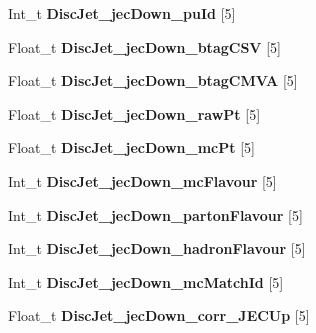 \begin{DoxyCompactItemize}
\hypertarget{classMiniTree_afe9c0e84d00805b89f1e4a75ca7475a2}{}\label{classMiniTree_afe9c0e84d00805b89f1e4a75ca7475a2} 
Int\+\_\+t {\bfseries Disc\+Jet\+\_\+jec\+Down\+\_\+pu\+Id} \mbox{[}5\mbox{]}
\item 
\hypertarget{classMiniTree_a3c160242de6b3affbdd6c7a5c86b419f}{}\label{classMiniTree_a3c160242de6b3affbdd6c7a5c86b419f} 
Float\+\_\+t {\bfseries Disc\+Jet\+\_\+jec\+Down\+\_\+btag\+C\+SV} \mbox{[}5\mbox{]}
\item 
\hypertarget{classMiniTree_a4123243bed4af1fbe32d3fdfa10d9962}{}\label{classMiniTree_a4123243bed4af1fbe32d3fdfa10d9962} 
Float\+\_\+t {\bfseries Disc\+Jet\+\_\+jec\+Down\+\_\+btag\+C\+M\+VA} \mbox{[}5\mbox{]}
\item 
\hypertarget{classMiniTree_a879a1c51b3b085956882e660aad001a8}{}\label{classMiniTree_a879a1c51b3b085956882e660aad001a8} 
Float\+\_\+t {\bfseries Disc\+Jet\+\_\+jec\+Down\+\_\+raw\+Pt} \mbox{[}5\mbox{]}
\item 
\hypertarget{classMiniTree_a0db6da4e20027b93e8bca833937878b8}{}\label{classMiniTree_a0db6da4e20027b93e8bca833937878b8} 
Float\+\_\+t {\bfseries Disc\+Jet\+\_\+jec\+Down\+\_\+mc\+Pt} \mbox{[}5\mbox{]}
\item 
\hypertarget{classMiniTree_a07fc5d50c4f9489502cdff715662400a}{}\label{classMiniTree_a07fc5d50c4f9489502cdff715662400a} 
Int\+\_\+t {\bfseries Disc\+Jet\+\_\+jec\+Down\+\_\+mc\+Flavour} \mbox{[}5\mbox{]}
\item 
\hypertarget{classMiniTree_a234b7b1c234cd0ffa3b21810fbd57aec}{}\label{classMiniTree_a234b7b1c234cd0ffa3b21810fbd57aec} 
Int\+\_\+t {\bfseries Disc\+Jet\+\_\+jec\+Down\+\_\+parton\+Flavour} \mbox{[}5\mbox{]}
\item 
\hypertarget{classMiniTree_ad23dca40a5c8d9ce988393129627ad4a}{}\label{classMiniTree_ad23dca40a5c8d9ce988393129627ad4a} 
Int\+\_\+t {\bfseries Disc\+Jet\+\_\+jec\+Down\+\_\+hadron\+Flavour} \mbox{[}5\mbox{]}
\item 
\hypertarget{classMiniTree_a35bf296a37ad9061cdd4b91f5beef716}{}\label{classMiniTree_a35bf296a37ad9061cdd4b91f5beef716} 
Int\+\_\+t {\bfseries Disc\+Jet\+\_\+jec\+Down\+\_\+mc\+Match\+Id} \mbox{[}5\mbox{]}
\item 
\hypertarget{classMiniTree_ac71649e5c995dd9e1ca485afa0263a32}{}\label{classMiniTree_ac71649e5c995dd9e1ca485afa0263a32} 
Float\+\_\+t {\bfseries Disc\+Jet\+\_\+jec\+Down\+\_\+corr\+\_\+\+J\+E\+C\+Up} \mbox{[}5\mbox{]}
\item 
\hypertarget{classMiniTree_a14a989d350c3ea5e68b67b01616120c5}{}\label{classMiniTree_a14a989d350c3ea5e68b67b01616120c5} 

\end{DoxyCompactItemize}
